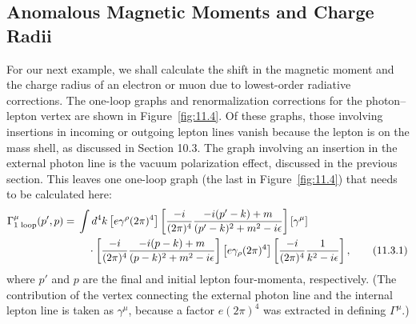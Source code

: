 
\clearpage


\subsection{Anomalous Magnetic Moments and Charge Radii}

For our next example, we shall calculate the shift in the magnetic moment
and the charge radius of an electron or muon due to lowest-order radiative
corrections. The one-loop graphs and renormalization corrections for the
photon--lepton vertex are shown in Figure~\ref{fig:11.4}. Of these graphs, those
involving insertions in incoming or outgoing lepton lines vanish because the
lepton is on the mass shell, as discussed in Section 10.3. The graph involving
an insertion in the external photon line is the vacuum polarization effect,
discussed in the previous section. This leaves one one-loop graph (the last in
Figure~\ref{fig:11.4}) that needs to be calculated here:
\begin{align}
\Gamma^\mu_{\text{1 loop}}(p',p)={}&\int d^4k
 \left[e\gamma^\rho(2\pi)^4\right]
 \left[{ -i\over(2\pi)^4}
 { -i(\sl{p}'-\sl{k})+m\over(p'-k)^2+m^2-i\epsilon}\right]
 \left[\gamma^\mu\right]\notag\\
&\quad\cdot
 \left[{ -i\over(2\pi)^4}
 { -i(\sl{p}-\sl{k})+m\over(p-k)^2+m^2-i\epsilon}\right]
 \left[e\gamma_\rho(2\pi)^4\right]
 \left[{ -i\over(2\pi)^4}{1\over k^2-i\epsilon}\right],
\tag{11.3.1}\label{eq:11.3.1}
\end{align}
where $p'$ and $p$ are the final and initial lepton four-momenta,
respectively. (The contribution of the vertex connecting the external photon
line and the internal lepton line is taken as $\gamma^\mu$, because a factor
$e(2\pi)^4$ was extracted in defining $\Gamma^\mu$.)

